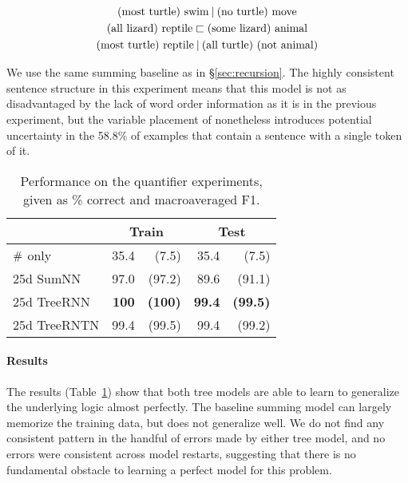 \vspace{-0.6cm}
\begin{gather}
  \text{(most turtle) swim} \mathbin{|} \text{(no turtle) move}\label{p1}
  \\
  \text{(all lizard) reptile} \sqsubset  \text{(some lizard) animal}\label{p2}
  \\
  \text{(most turtle) reptile} \mathbin{|} \text{(all turtle) (not animal)}\label{p3}
\end{gather}

We use the same summing baseline as in \S\ref{sec:recursion}.
The highly consistent  sentence structure in this experiment means that this model
is not as disadvantaged by the lack of word order information as it is in the previous experiment, 
but the variable placement of   nonetheless introduces potential uncertainty in the 58.8\% 
of examples that contain a sentence with a single token of it.

\begin{table}[tp]
  \centering\small
    \begin{tabular}{ l r@{ \ }r r@{ \ }r }
    
    \toprule
    ~ & \multicolumn{2}{c}{Train} & \multicolumn{2}{c}{Test} \\
    \midrule
    $\mathbin{\#}$ only &	35.4 & (7.5)	& 35.4	& (7.5)\\
    25d SumNN	&	97.0&	(97.2)&	89.6&	(91.1)\\	
    25d TreeRNN	&	\textbf{100}&	\textbf{(100)}&	\textbf{99.4}&	\textbf{(99.5)}\\
    25d TreeRNTN	&	99.4&(99.5)&	99.4 & (99.2)\\
    \bottomrule
  \end{tabular}
  
  \caption{Performance on the quantifier experiments, given as \% correct and macroaveraged F1.}
  \label{qresultstable}
\end{table} 

%

%
\paragraph{Results} The results (Table~\ref{qresultstable}) show that both tree models are able to learn to generalize the underlying logic almost perfectly. The baseline summing model can largely memorize the training data, but does not generalize well. We do not find any consistent pattern in the handful of errors made by either tree model, and no errors were consistent across model restarts, suggesting that there is no fundamental obstacle to learning a perfect model for this problem.

